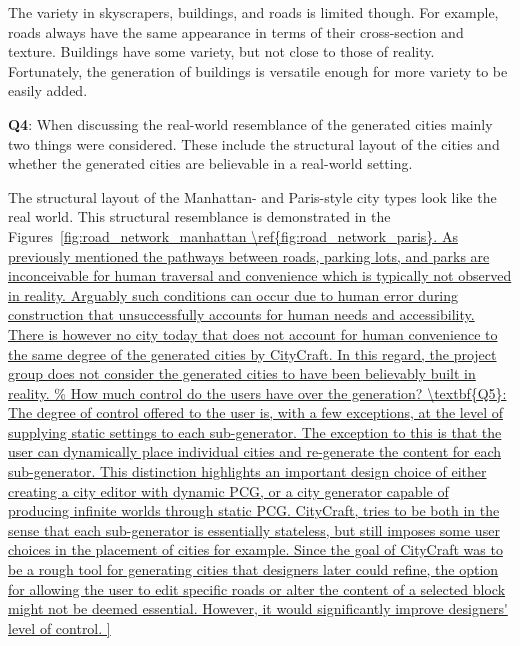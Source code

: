 The variety in skyscrapers, buildings, and roads is limited though.
For example, roads always have the same appearance in terms of their cross-section and texture.
Buildings have some variety, but not close to those of reality.
Fortunately, the generation of buildings is versatile enough for more variety to be easily added.

\textbf{Q4}:
When discussing the real-world resemblance of the generated cities mainly two things were considered.
These include the structural layout of the cities and whether the generated cities are believable in a real-world setting. 

The structural layout of the Manhattan- and Paris-style city types look like the real world.
This structural resemblance is demonstrated in the Figures~\ref{fig:road_network_manhattan \ref{fig:road_network_paris}.

As previously mentioned the pathways between roads, parking lots, and parks are inconceivable for human traversal and convenience which is typically not observed in reality.
Arguably such conditions can occur due to human error during construction that unsuccessfully accounts for human needs and accessibility.
There is however no city today that does not account for human convenience to the same degree of the generated cities by CityCraft.
In this regard, the project group does not consider the generated cities to have been believably built in reality.

\textbf{Q5}:
The degree of control offered to the user is, with a few exceptions, at the level of supplying static settings to each sub-generator.
The exception to this is that the user can dynamically place individual cities and re-generate the content for each sub-generator.
This distinction highlights an important design choice of either creating a city editor with dynamic PCG, or a city generator capable of producing infinite worlds through static PCG.
CityCraft, tries to be both in the sense that each sub-generator is essentially stateless, but still imposes some user choices in the placement of cities for example.
Since the goal of CityCraft was to be a rough tool for generating cities that designers later could refine, the option for allowing the user to edit specific roads or alter the content of a selected block might not be deemed essential.
However, it would significantly improve designers' level of control.

}
